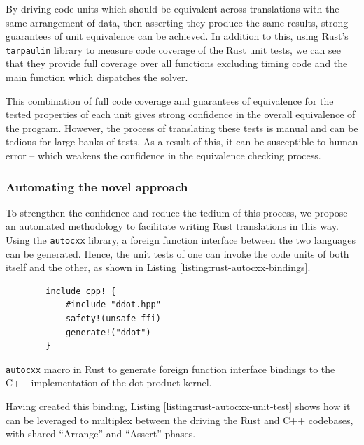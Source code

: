 By driving code units which should be equivalent across translations with the same arrangement of data, then asserting they produce the same results, strong guarantees of unit equivalence can be achieved. In addition to this, using Rust's \texttt{tarpaulin} library \cite{xd009642Xd009642Tarpaulin2024} to measure code coverage of the Rust unit tests, we can see that they provide full coverage over all functions excluding timing code and the main function which dispatches the solver. 

This combination of full code coverage and guarantees of equivalence for the tested properties of each unit gives strong confidence in the overall equivalence of the program. However, the process of translating these tests is manual and can be tedious for large banks of tests. As a result of this, it can be susceptible to human error -- which weakens the confidence in the equivalence checking process.

\subsubsection{Automating the novel approach}
\label{sssec:equivalence-polyglotest}

To strengthen the confidence and reduce the tedium of this process, we propose an automated methodology to facilitate writing Rust translations in this way. Using the \texttt{autocxx} library, a foreign function interface between the two languages can be generated. Hence, the unit tests of one can invoke the code units of both itself and the other, as shown in Listing \ref{listing:rust-autocxx-bindings}.

\begin{code}
    \begin{verbatim}
        include_cpp! {
            #include "ddot.hpp"
            safety!(unsafe_ffi)
            generate!("ddot")
        }
    \end{verbatim}
    \caption{\texttt{autocxx} macro in Rust to generate foreign function interface bindings to the C++ implementation of the dot product kernel.}
    \label{listing:rust-autocxx-bindings}
\end{code}

Having created this binding, Listing \ref{listing:rust-autocxx-unit-test} shows how it can be leveraged to multiplex between the driving the Rust and C++ codebases, with shared ``Arrange'' and ``Assert'' phases.

